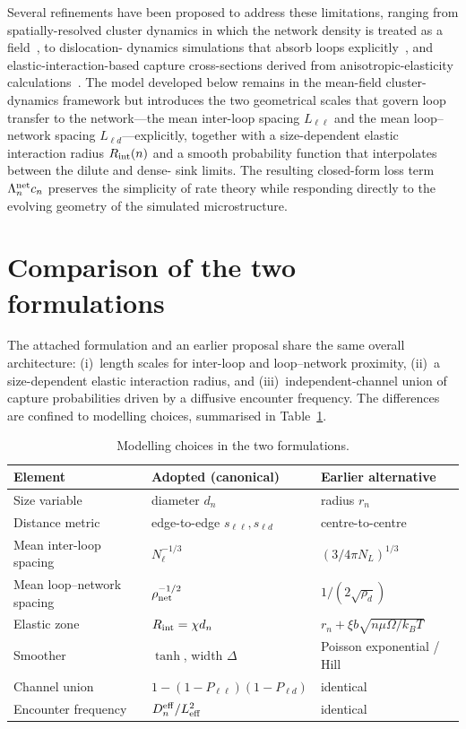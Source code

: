 \documentclass[11pt,a4paper]{article}
\begin{document}
Several refinements have been proposed to address these limitations,
ranging from spatially-resolved cluster dynamics in which the network
density is treated as a field~\citep{KohnertWirth2018}, to dislocation-
dynamics simulations that absorb loops explicitly~\citep{Arsenlis2004},
and elastic-interaction-based capture cross-sections derived from
anisotropic-elasticity calculations~\citep{Dudarev2003}.  The model
developed below remains in the mean-field cluster-dynamics framework
but introduces the two geometrical scales that govern loop transfer to
the network---the mean inter-loop spacing $L_{\ell\ell}$ and the mean
loop--network spacing $L_{\ell d}$---explicitly, together with a
size-dependent elastic interaction radius $R_{\rm int}(n)$ and a smooth
probability function that interpolates between the dilute and dense-
sink limits.  The resulting closed-form loss term
$\Lambda_n^{\rm net}c_n$ preserves the simplicity of rate theory while
responding directly to the evolving geometry of the simulated
microstructure.

\section*{Comparison of the two formulations}

The attached formulation and an earlier proposal share the same overall
architecture: (i)~length scales for inter-loop and loop--network
proximity, (ii)~a size-dependent elastic interaction radius, and
(iii)~independent-channel union of capture probabilities driven by a
diffusive encounter frequency.  The differences are confined to
modelling choices, summarised in Table~\ref{tab:diffs}.

\begin{table}[h]
\centering
\small
\begin{tabular}{lll}
\toprule
Element & Adopted (canonical) & Earlier alternative \\
\midrule
Size variable                & diameter $d_n$              & radius $r_n$ \\
Distance metric              & edge-to-edge $s_{\ell\ell},s_{\ell d}$ & centre-to-centre \\
Mean inter-loop spacing      & $N_\ell^{-1/3}$             & $(3/4\pi N_L)^{1/3}$ \\
Mean loop--network spacing   & $\rho_{\rm net}^{-1/2}$     & $1/(2\sqrt{\rho_d})$ \\
Elastic zone                 & $R_{\rm int}=\chi d_n$       & $r_n+\xi b\sqrt{n\mu\Omega/k_BT}$ \\
Smoother                     & $\tanh$, width $\Delta$     & Poisson exponential / Hill \\
Channel union                & $1-(1-P_{\ell\ell})(1-P_{\ell d})$ & identical \\
Encounter frequency          & $D_n^{\rm eff}/L_{\rm eff}^2$ & identical \\
\bottomrule
\end{tabular}
\caption{Modelling choices in the two formulations.}
\label{tab:diffs}
\end{table}
\end{document}
